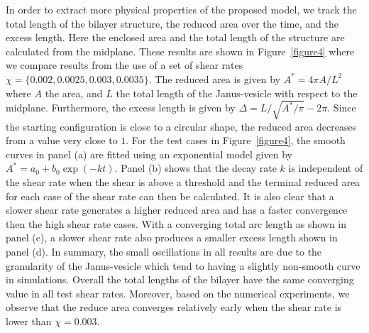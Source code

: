 \documentclass[lineno]{jfm}
\begin{document}
In order to extract more physical properties of the proposed model, we track the total length of the bilayer structure, the reduced area over the time, and the excess length. Here the enclosed area and the total length of the structure are calculated from the midplane.
These results are shown in Figure~\ref{figure4} where we compare results from the use of a set of shear 
rates $\chi=\{0.002,0.0025,0.003,0.0035\}$. 
The reduced area is given by $A^* = 4\pi A/L^2$ where $A$ the area, and $L$ the total length of the Janus-vesicle with respect to the midplane. 
Furthermore, the excess length is given by $\Delta=L/\sqrt{A^*/\pi}-2\pi$.
Since the starting configuration is close to a circular shape, the reduced area decreases from a value very close to $1$. For the test cases in Figure~\ref{figure4}, the smooth curves in panel (a) are fitted using an
exponential model given by $A^* = a_0 + b_0 \exp(-kt)$. Panel (b) shows that the decay rate $k$ is independent of the shear rate when the shear is above a threshold and the terminal reduced area for each 
case of the shear rate can then be calculated. It is also clear that a slower shear rate generates a higher reduced area and has a faster convergence then the high shear rate cases. 
With a converging total arc length as shown in panel (c), a slower shear rate also produces a smaller excess length shown in panel (d).
In summary, the small oscillations in all results are due to the granularity of the Janus-vesicle which tend to having a slightly non-smooth curve in simulations. Overall the total lengths of the bilayer have the same converging value in all test shear rates. Moreover, based on the numerical experiments, we observe that the reduce area converges relatively early when the shear rate is lower than $\chi=0.003$. 
\end{document}
